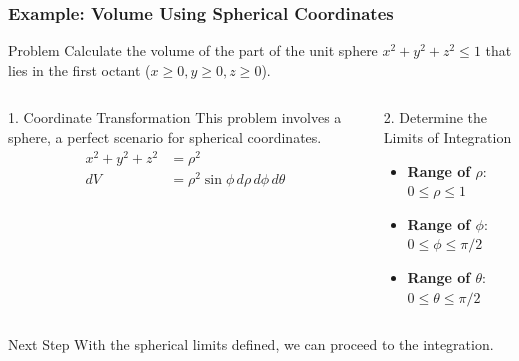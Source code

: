 \documentclass[aspectratio=169, UTF8]{beamer}
\begin{document}
\begin{frame}
\frametitle{Example: Volume Using Spherical Coordinates}

\begin{block}{Problem}
    Calculate the volume of the part of the unit sphere $x^2+y^2+z^2 \le 1$ that lies in the first octant ($x\ge0, y\ge0, z\ge0$).
\end{block}

\begin{columns}[T]
    \begin{column}{0.5\textwidth}
        \begin{block}{1. Coordinate Transformation}
            This problem involves a sphere, a perfect scenario for spherical coordinates.
            \begin{align*}
                 x^2+y^2+z^2 &= \rho^2 \\
                 dV &= \rho^2 \sin\phi \, d\rho \, d\phi \, d\theta
            \end{align*}
        \end{block}
    \end{column}
    
    \begin{column}{0.5\textwidth}
        \begin{block}{2. Determine the Limits of Integration}
            \begin{itemize}
                \item \textbf{Range of $\rho$}: \\ $0 \le \rho \le 1$
                \item \textbf{Range of $\phi$}: \\ $0 \le \phi \le \pi/2$
                \item \textbf{Range of $\theta$}: \\ $0 \le \theta \le \pi/2$
            \end{itemize}
        \end{block}
    \end{column}
\end{columns}

\begin{alertblock}{Next Step}
    With the spherical limits defined, we can proceed to the integration.
\end{alertblock}

\end{frame}
\end{document}
